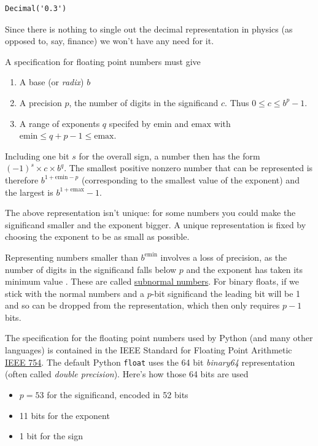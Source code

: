 \documentclass[
  letterpaper,
  DIV=11,
  numbers=noendperiod]{scrreprt}
\providecommand{\tightlist}{%
  \setlength{\itemsep}{0pt}\setlength{\parskip}{0pt}}\usepackage{longtable,booktabs,array}
\theoremstyle{definition}
\theoremstyle{remark}
\begin{document}
\begin{verbatim}
Decimal('0.3')
\end{verbatim}

Since there is nothing to single out the decimal representation in
physics (as opposed to, say, finance) we won't have any need for it.

A specification for floating point numbers must give

\begin{enumerate}
\def\labelenumi{\arabic{enumi}.}
\tightlist
\item
  A base (or \emph{radix}) \(b\)
\item
  A precision \(p\), the number of digits in the significand \(c\). Thus
  \(0\leq c \leq b^{p}-1\).
\item
  A range of exponents \(q\) specifed by \(\text{emin}\) and
  \(\text{emax}\) with \(\text{emin}\leq q+p-1 \leq \text{emax}\).
\end{enumerate}

Including one bit \(s\) for the overall sign, a number then has the form
\((-1)^s\times c \times b^q\). The smallest positive nonzero number that
can be represented is therefore \(b^{1 + \text{emin} - p}\)
(corresponding to the smallest value of the exponent) and the largest is
\(b^{1 + \text{emax}} - 1\).

The above representation isn't unique: for some numbers you could make
the significand smaller and the exponent bigger. A unique representation
is fixed by choosing the exponent to be as small as possible.

Representing numbers smaller than \(b^{\text{emin}}\) involves a loss of
precision, as the number of digits in the significand falls below \(p\)
and the exponent has taken its minimum value . These are called
\href{https://en.wikipedia.org/wiki/Subnormal_number}{subnormal
numbers}. For binary floats, if we stick with the normal numbers and a
\(p\)-bit significand the leading bit will be 1 and so can be dropped
from the representation, which then only requires \(p-1\) bits.

The specification for the floating point numbers used by Python (and
many other languages) is contained in the IEEE Standard for Floating
Point Arithmetic \href{https://en.wikipedia.org/wiki/IEEE_754}{IEEE
754}. The default Python \texttt{float} uses the 64 bit \emph{binary64}
representation (often called \emph{double precision}). Here's how those
64 bits are used

\begin{itemize}
\tightlist
\item
  \(p=53\) for the significand, encoded in 52 bits
\item
  11 bits for the exponent
\item
  1 bit for the sign
\end{itemize}
\end{document}
